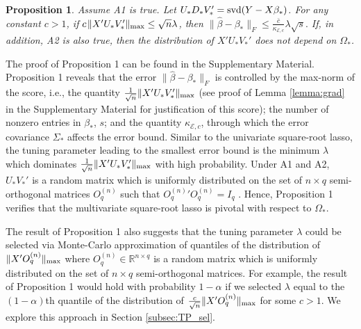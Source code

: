 \documentclass[12pt]{article}
\newtheorem{prop}{Proposition}
\begin{document}
\begin{prop}
Assume A1 is true. Let $U_* D_* V_*' = {\rm svd}(Y - X\beta_*)$. For any constant $c > 1$,  if $c \hspace{1pt} \|X'U_* V_*'\|_{\rm max} \leq \sqrt{n} \lambda$, then
$\|\hat{\beta} - \beta_*\|_F \leq \frac{\bar{c}}{\kappa_{\mathcal{E},c}}\lambda \sqrt{s}.$
If, in addition, A2 is also true, then the distribution of $X'U_*V_*'$ does not depend on $\Omega_*$. 
\end{prop}
The proof of Proposition 1 can be found in the Supplementary Material. 
Proposition 1 reveals that the error $\|\hat{\beta} - \beta_*\|_F$ is controlled by the max-norm of the score, i.e., the quantity $\frac{1}{\sqrt{n}}\|X'U_* V_*'\|_{\rm max}$ (see proof of Lemma \ref{lemma:grad} in the Supplementary Material for justification of this score); the number of nonzero entries in $\beta_*$, $s$;  and the quantity $\kappa_{\mathcal{E},c}$, through which the error covariance $\Sigma_*$ affects the error bound. Similar to the univariate square-root lasso, the tuning parameter leading to the smallest error bound is the minimum $\lambda$ which dominates $\frac{1}{\sqrt{n}}\|X'U_*V_*'\|_{\rm max}$ with high probability. Under A1 and A2, $U_* V_*'$ is a random matrix which is uniformly distributed on the set of $n \times q$ semi-orthogonal matrices $O^{(n)}_q$ such that ${O^{(n)}_q}'O^{(n)}_q = I_q$ \citep{eaton}. Hence, Proposition 1 verifies that the multivariate square-root lasso is pivotal with respect to $\Omega_*$. 


The result of Proposition 1 also suggests that the tuning parameter $\lambda$ could be selected via Monte-Carlo approximation of quantiles of the distribution of $\|X'O^{(n)}_q\|_{\rm max}$ where $O^{(n)}_q \in \mathbb{R}^{n \times q}$ is a random matrix which is uniformly distributed on the set of $n \times q$ semi-orthogonal matrices. For example, the result of Proposition 1 would hold with probability $1 - \alpha$ if we selected $\lambda$ equal to the $(1-\alpha)$th quantile of the distribution of $\frac{c}{\sqrt{n}}\|X'O^{(n)}_q\|_{\rm max}$ for some $c>1$. We explore this approach in Section \ref{subsec:TP_sel}. 
\end{document}
